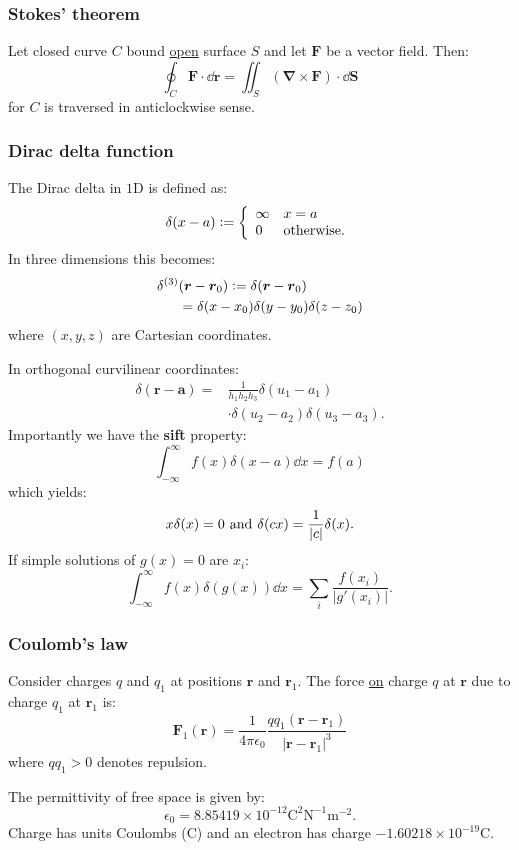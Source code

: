 \documentclass{article}
\newcommand{\deq}{\vcentcolon=}
\newcommand{\vc}[1]{\boldsymbol{#1}}
\begin{document}
\begin{multicols*}{3}
\subsubsection*{Stokes' theorem}
Let closed curve $C$ bound \underline{open} surface $S$
and let $\vc{F}$ be a vector field. Then:
$$\oint_C \vc{F}\cdot\dd\vc{r}
=\iint_S (\vc{\nabla}\times\vc{F})\cdot\dd\vc{S}$$
for $C$ is traversed in anticlockwise sense.

\subsubsection*{Dirac delta function}
The Dirac delta in $1$D is defined as:
$$\delta(x-a)\deq\left\{\begin{array}{ll}
    \infty & x=a \\
    0 & \text{otherwise}.
\end{array}\right.$$
In three dimensions this becomes:
\begin{align*}
    \delta^{(3)}&(\vc{r}-\vc{r}_0)
    \deq\delta(\vc{r}-\vc{r}_0) \\
    &=\delta(x-x_0)\delta(y-y_0)\delta(z-z_0)
\end{align*}
where $(x,y,z)$ are Cartesian coordinates.

In orthogonal curvilinear coordinates:
\begin{align*}
    \delta(\vc{r}-\vc{a})
    =&\frac{1}{h_1 h_2 h_3}\delta(u_1-a_1) \\
    &\cdot\delta(u_2-a_2)\delta(u_3-a_3).
\end{align*}
Importantly we have the \textbf{sift} property:
$$\int_{-\infty}^{\infty}f(x)\delta(x-a)\dd x=f(a)$$
which yields:
$$x\delta(x)=0
\hspace{0.05in}\text{and}\hspace{0.05in}
\delta(cx)=\frac{1}{|c|}\delta(x).$$
If simple solutions of $g(x)=0$ are $x_i$:
$$\int_{-\infty}^{\infty}f(x)\delta(g(x))\dd x
=\sum_i\frac{f(x_i)}{|g'(x_i)|}.$$

\subsubsection*{Coulomb's law}
Consider charges $q$ and $q_1$ at positions
$\vc{r}$ and $\vc{r}_1$.
The force \underline{on} charge $q$ at $\vc{r}$
due to charge $q_1$ at $\vc{r}_1$ is:
$$\vc{F}_1(\vc{r})=\frac{1}{4\pi\epsilon_0}
\frac{q q_1(\vc{r}-\vc{r}_1)}{|\vc{r}-\vc{r}_1|^3}$$
where $q q_1>0$ denotes repulsion.

The permittivity of free space is given by:
$$\epsilon_0=8.85419\times10^{-12}
\text{C}^2\text{N}^{-1}\text{m}^{-2}.$$
Charge has units Coulombs (C) and an electron
has charge $-1.60218\times 10^{-19}$C.


\end{multicols*}
\end{document}
